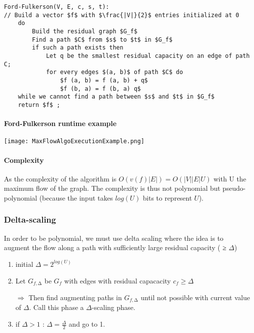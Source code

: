 \begin{lstlisting}[mathescape]
Ford-Fulkerson(V, E, c, s, t):
// Build a vector $f$ with $\frac{|V|}{2}$ entries initialized at 0
    do
        Build the residual graph $G_f$ 
        Find a path $C$ from $s$ to $t$ in $G_f$ 
        if such a path exists then
            Let q be the smallest residual capacity on an edge of path C;
            for every edges $(a, b)$ of path $C$ do
                $f (a, b) = f (a, b) + q$
                $f (b, a) = f (b, a) q$
    while we cannot find a path between $s$ and $t$ in $G_f$ 
    return $f$ ;
\end{lstlisting}

\paragraph{Ford-Fulkerson runtime example}
\begin{center}
    \texttt{[image: MaxFlowAlgoExecutionExample.png]}
\end{center}

\paragraph{Complexity}
As the complexity of the algorithm is $O(v(f) |E|) = O(|V| |E| U)$ with U the
maximum flow of the graph. The complexity is thus not polynomial but
pseudo-polynomial (because the input takes $log(U)$ bits to represent
$U$). 

\subsubsection{Delta-scaling}
In order to be polynomial, we must use
delta scaling where the idea is to augment the flow along a path with sufficiently large
residual capacity ( ≥ $\Delta$)

\begin{enumerate}
    \item initial $\Delta = 2^{log(U)}$
    \item Let $G_{f,∆}$ be $G_f$ with edges with residual capacacity $c_f \geq \Delta$ 

        $\Rightarrow$ Then find augmenting paths in $G_{f,∆}$ until not
        possible with current value of $\Delta$. Call this phase a
        $\Delta$-scaling phase.

    \item if $\Delta > 1$ : $\Delta = \frac{\Delta}{2}$ and go to 1.

\end{enumerate}

